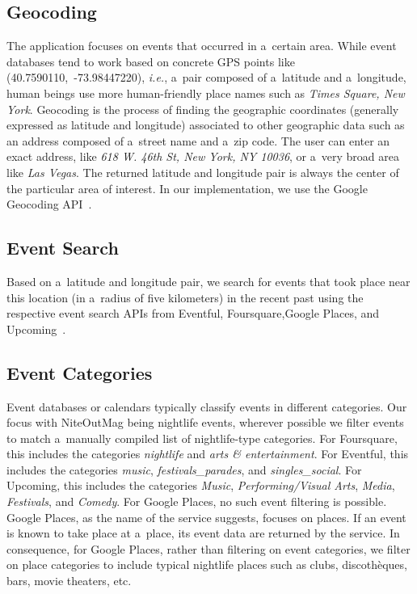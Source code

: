 \documentclass[runningheads,a4paper]{llncs}
\begin{document}
{\subsection{Geocoding}
The application focuses on events that occurred in a~certain area. While event databases tend to work based on concrete GPS points like
\mbox{(40.7590110, -73.98447220)}, \emph{i.e.}, a~pair composed of a~latitude and a~longitude, human beings use more human-friendly place names such as \emph{Times Square, New York}. Geocoding is the process of finding the geographic coordinates (generally expressed as latitude and longitude) associated to other geographic data such as an address composed of a~street name and a~zip code. The user can enter an exact address, like \emph{618 W. 46th St, New York, NY 10036}, or a~very broad area like \emph{Las Vegas}. The returned latitude and longitude pair is always the center of the particular area of interest. In our implementation, we use the Google Geocoding API~\cite{Geocoding2012}.

\subsection{Event Search} \label{sec:event-search}
Based on a~latitude and longitude pair, we search for events that took place near this location (in a~radius of five kilometers) in the recent past using the respective event search APIs from Eventful, Foursquare,Google Places, and Upcoming~\cite{Eventful2012,Foursquare2012,GooglePlaces2012,Upcoming2012}.

\subsection{Event Categories}
Event databases or calendars typically classify events in different categories.
Our focus with NiteOutMag being nightlife events,
wherever possible we filter events to match
a~manually compiled list of nightlife-type categories.
For Foursquare, this includes the categories \emph{nightlife} and \emph{arts \& entertainment}.
For Eventful, this includes the categories \emph{music}, \emph{festivals\_parades}, and \emph{singles\_social}.
For Upcoming, this includes the categories \emph{Music}, \emph{Performing/Visual Arts}, \emph{Media}, \emph{Festivals}, and \emph{Comedy}.
For Google Places, no such event filtering is possible.
Google Places, as the name of the service suggests, focuses on places.
If an event is known to take place at a~place, its event data are returned by the service.
In consequence, for Google Places, rather than filtering on event categories,
we filter on place categories to include typical nightlife places
such as clubs, discothèques, bars, movie theaters, etc.

}
\end{document}

